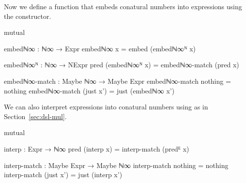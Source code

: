 Now we define a function that embeds conatural numbers into expressions using
the  constructor.
\begin{code}[hide]
mutual
\end{code}
\begin{code}
  embedℕ∞ : ℕ∞ → Expr
  embedℕ∞ x = embed (embedℕ∞ᴺ x)

  embedℕ∞ᴺ : ℕ∞ → NExpr
  pred (embedℕ∞ᴺ x) = embedℕ∞-match (pred x)

  embedℕ∞-match : Maybe ℕ∞ → Maybe Expr
  embedℕ∞-match nothing    = nothing
  embedℕ∞-match (just x')  = just (embedℕ∞ x')
\end{code}
We can also interpret expressions into conatural numbers using
 as in Section~\ref{sec:dsl-mul}.
\begin{code}[hide]
mutual
\end{code}
\begin{code}
  interp : Expr → ℕ∞
  pred (interp x) = interp-match (predᴱ x)

  interp-match : Maybe Expr → Maybe ℕ∞
  interp-match nothing    = nothing
  interp-match (just x')  = just (interp x')
\end{code}

